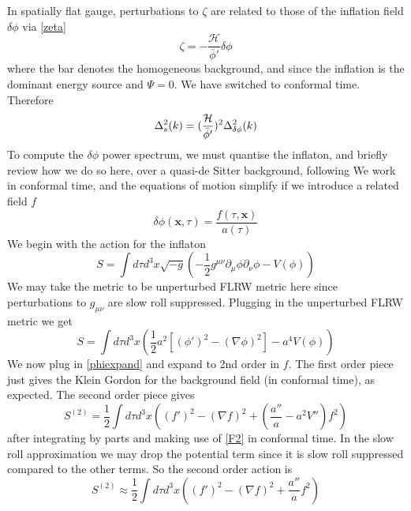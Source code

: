 \documentclass[a4paper,10pt]{article}
\renewcommand{\v}[1]{\mathbf{#1}}
\newcommand{\half}{\frac{1}{2}}
\newcommand{\bphi}{\bar{\phi}}
\begin{document}
In spatially flat gauge, perturbations to $\zeta$ are related to those of the inflation field $\delta\phi$ via \ref{zeta}
\begin{equation}
\zeta = -\frac{\mathcal{H}}{\bphi'}\delta\phi
\end{equation}
where the bar denotes the homogeneous background, and since the inflation is the dominant energy source and $\Psi = 0$. We have switched to conformal time. Therefore
\begin{equation}
\Delta^2_{s}(k) =(\frac{\mathcal{H}}{\bphi'})^2\Delta^2_{\delta\phi}(k)\\
\end{equation}
To compute the $\delta\phi$ power spectrum, we must quantise the inflaton, and briefly review how we do so here, over a quasi-de Sitter background, following \cite{baumann} We work in conformal time, and the equations of motion simplify if we introduce a related field $f$ 
\begin{equation}
\delta\phi(\v{x},\tau) = \frac{f(\tau, \v{x})}{a(\tau)}
\label{phiexpand}
\end{equation}
We begin with the action for the inflaton
\begin{equation}
S =  \int d\tau d^3x \sqrt{-g} \left(-\half g^{\mu \nu}\partial_\mu \phi\partial_\nu \phi - V(\phi)\right)
\end{equation}
We may take the metric to be unperturbed FLRW metric here since perturbations to $g_{\mu\nu}$ are slow roll suppressed. Plugging in the unperturbed FLRW metric we get 
\begin{equation}
S = \int d\tau d^3x \left(\half a^2 [(\phi ' )^2 -(\nabla \phi)^2]-a^4V(\phi)\right)
\label{scalarfieldaction}
\end{equation}
We now plug in \ref{phiexpand} and expand to 2nd order in $f$. The first order piece just gives the Klein Gordon for the background field (in conformal time), as expected. The second order piece gives
\begin{equation}
S^{(2)} = \half \int d\tau d^3x \left((f')^2 - (\nabla f)^2 + (\frac{a''}{a}-a^2V'')f^2\right)
\end{equation}
after integrating by parts and making use of \ref{F2} in conformal time. In the slow roll approximation we may drop the potential term since it is slow roll suppressed compared to the other terms. So the second order action is 
\begin{equation}
S^{(2)} \approx \half \int d\tau d^3x \left((f')^2 - (\nabla f)^2 + \frac{a''}{a}f^2\right)
\end{equation}
\end{document}
